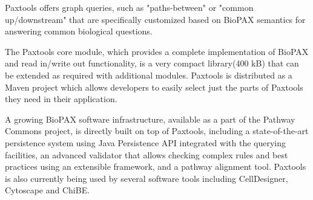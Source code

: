\documentclass{tufte-book}
\begin{document}
 Paxtools offers graph queries, such as "paths-between" or "common up/downstream" that are specifically customized based on BioPAX semantics for answering common biological questions. 

 The Paxtools core module, which provides a complete implementation of BioPAX and read in/write out functionality, is a very compact library(400 kB) that can be extended as required with additional modules. Paxtools is distributed as a Maven project which allows developers to easily select just the parts of Paxtools they need in their application.

 A growing BioPAX software infrastructure, available as a part of the Pathway Commons project, is directly built on top of Paxtools, including a state-of-the-art persistence system using Java Persistence API integrated with the querying facilities, an advanced validator that allows checking complex rules and best practices using an extensible framework, and a pathway alignment tool. Paxtools is also currently being used by several software tools including CellDesigner\cite{mi2011}, Cytoscape\cite{Cline2007} and ChiBE\cite{Babur2010}. 
\bigskip
\end{document}

